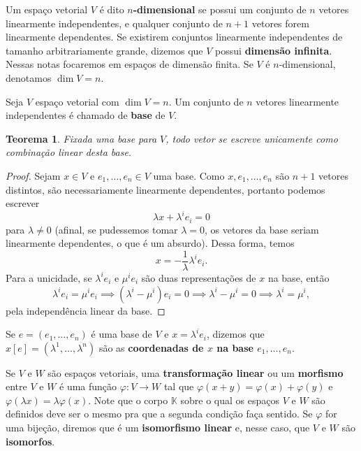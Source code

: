 \documentclass{article}
\newtheorem{theorem}[definition]{Teorema}
\renewcommand{\phi}{\varphi}
\begin{document}
Um espaço vetorial $V$ é dito \textbf{$n$-dimensional} se possui um conjunto de $n$ vetores linearmente independentes, e qualquer conjunto de $n+1$ vetores forem linearmente dependentes. Se existirem conjuntos linearmente independentes de tamanho arbitrariamente grande, dizemos que $V$ possui \textbf{dimensão infinita}. Nessas notas focaremos em espaços de dimensão finita. Se $V$ é $n$-dimensional, denotamos $\dim V = n$.

Seja $V$ espaço vetorial com $\dim V = n$. Um conjunto de $n$ vetores linearmente independentes é chamado de \textbf{base} de $V$.

\begin{theorem}
    Fixada uma base para $V$, todo vetor se escreve unicamente como combinação linear desta base.
\end{theorem}
\begin{proof}
    Sejam $x \in V$ e $e_1, \dots, e_n \in V$ uma base. Como $x, e_1, \dots, e_n$ são $n+1$ vetores distintos, são necessariamente linearmente dependentes, portanto podemos escrever \begin{equation}
        \lambda x + \lambda^ie_i = 0
    \end{equation} para $\lambda \neq 0$ (afinal, se pudessemos tomar $\lambda = 0$, os vetores da base seriam linearmente dependentes, o que é um absurdo). Dessa forma, temos \begin{equation}
        x = -\frac{1}{\lambda}\lambda^ie_i.
    \end{equation} Para a unicidade, se $\lambda^ie_i$ e $\mu^ie_i$ são duas representações de $x$ na base, então \begin{equation}
        \lambda^ie_i = \mu^ie_i \implies (\lambda^i - \mu^i)e_i = 0 \implies \lambda^i - \mu^i = 0 \implies \lambda^i = \mu^i,
    \end{equation} pela independência linear da base.
\end{proof}

Se $e = (e_1, \dots, e_n)$ é uma base de $V$ e $x = \lambda^ie_i$, dizemos que $x[e] = (\lambda^1, \dots, \lambda^n)$ são as \textbf{coordenadas de $x$ na base $e_1, \dots, e_n$}.

Se $V$ e $W$ são espaços vetoriais, uma \textbf{transformação linear} ou um \textbf{morfismo} entre $V$ e $W$ é uma função $\phi \colon V \to W$ tal que $\phi(x + y) = \phi(x) + \phi(y)$ e $\phi(\lambda x) = \lambda \phi(x)$. Note que o corpo $\mathbb{K}$ sobre o qual os espaços $V$ e $W$ são definidos deve ser o mesmo pra que a segunda condição faça sentido. Se $\phi$ for uma bijeção, diremos que é um \textbf{isomorfismo linear} e, nesse caso, que $V$ e $W$ são \textbf{isomorfos}. 
\end{document}
